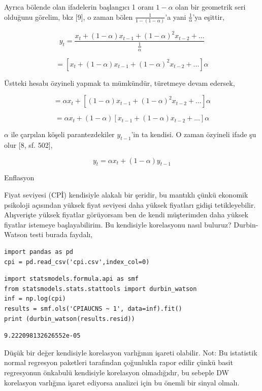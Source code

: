 \documentclass[12pt,fleqn]{article}\usepackage{../../common}
\begin{document}
Ayrıca bölende olan ifadelerin başlangıcı 1 oranı $1-\alpha$ olan bir
geometrik seri olduğunu görelim, bkz [9], o zaman bölen
$\frac{1}{1-(1-\alpha)}$'a yani $\frac{1}{\alpha}$'ya eşittir,

$$ y_t = \frac{x_t + (1-\alpha)x_{t-1} + (1-\alpha)^2x_{t-2} + ... }
{\frac{1}{\alpha}}
$$

$$  = [ x_t + (1-\alpha)x_{t-1} + (1-\alpha)^2x_{t-2} + ... ] \alpha $$

Üstteki hesabı özyineli yapmak ta mümkündür, türetmeye devam edersek,

$$  = \alpha x_t + [(1-\alpha)x_{t-1} + (1-\alpha)^2x_{t-2} + ... ]\alpha $$

$$  = \alpha x_t + (1-\alpha) [x_{t-1} + (1-\alpha)x_{t-2} + ... ]\alpha $$

$\alpha$ ile çarpılan köşeli parantezdekiler $y_{t-1}$'in ta kendisi. O
zaman özyineli ifade şu olur [8, sf. 502],

$$ y_t = \alpha x_t + (1-\alpha) y_{t-1}$$

Enflasyon

Fiyat seviyesi (CPİ) kendisiyle alakalı bir şeridir, bu mantıklı çünkü ekonomik
psikoloji açısından yüksek fiyat seviyesi daha yüksek fiyatları gidişi
tetikleyebilir. Alışverişte yüksek fiyatlar görüyorsam ben de kendi müşterimden
daha yüksek fiyatlar istemeye başlayabilirim. Bu kendisiyle korelasyonu
nasıl buluruz? Durbin-Watson testi burada faydalı,

\begin{verbatim}
import pandas as pd
cpi = pd.read_csv('cpi.csv',index_col=0)
\end{verbatim}

\begin{verbatim}
import statsmodels.formula.api as smf
from statsmodels.stats.stattools import durbin_watson
inf = np.log(cpi)
results = smf.ols('CPIAUCNS ~ 1', data=inf).fit()
print (durbin_watson(results.resid))
\end{verbatim}

\begin{verbatim}
9.222098132626552e-05
\end{verbatim}

Düşük bir değer kendisiyle korelasyon varlığının işareti olabilir. Not: Bu
istatistik normal regresyon paketleri tarafından çoğunlukla rapor edilir çünkü
basit regresyonun önkabulü kendisiyle korelasyon olmadığıdır, bu sebeple DW
korelasyon varlığına işaret ediyorsa analizci için bu önemli bir sinyal olmalı.
\end{document}
